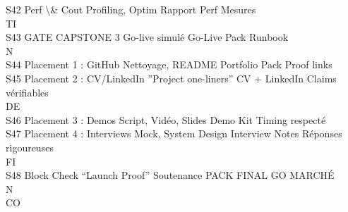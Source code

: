 \documentclass[12pt,landscape,a4paper]{article}
\begin{document}
S42    Perf \textbackslash{}& Cout                         Profiling, Optim             Rapport Perf           Mesures\\
\vspace{0.5em}
\vspace{0.5em}
\vspace{0.5em}
\vspace{0.5em}
TI\\
S43    GATE CAPSTONE 3                     Go-live simulé               Go-Live Pack           Runbook\\
\vspace{0.5em}
\vspace{0.5em}
\vspace{0.5em}
\vspace{0.5em}
N\\
S44    Placement 1 : GitHub                Nettoyage, README            Portfolio Pack         Proof links\\
S45    Placement 2 : CV/LinkedIn           ”Project one-liners”         CV + LinkedIn          Claims vérifiables\\
\vspace{0.5em}
\vspace{0.5em}
\vspace{0.5em}
\vspace{0.5em}
DE\\
S46    Placement 3 : Demos                 Script, Vidéo, Slides        Demo Kit               Timing respecté\\
S47    Placement 4 : Interviews            Mock, System Design          Interview Notes        Réponses rigoureuses\\
\vspace{0.5em}
\vspace{0.5em}
\vspace{0.5em}
\vspace{0.5em}
FI\\
S48    Block Check “Launch Proof”          Soutenance                   PACK FINAL             GO MARCHÉ\\
\vspace{0.5em}
\vspace{0.5em}
\vspace{0.5em}
\vspace{0.5em}
N\\
CO\\
\vspace{0.5em}
\vspace{0.5em}
\vspace{0.5em}
\end{document}
